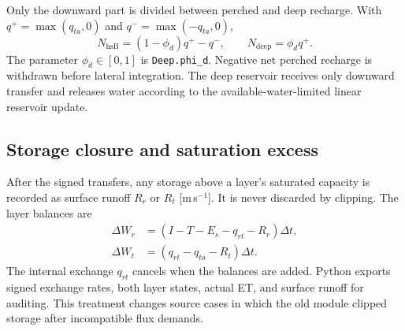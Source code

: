 Only the downward part is divided between perched and deep recharge. With $q^+=\max(q_{ta},0)$ and $q^-=\max(-q_{ta},0)$,
\begin{equation}
N_{\mathrm{hsB}}=(1-\phi_d)q^+-q^-,\qquad
N_{\mathrm{deep}}=\phi_d q^+.
\label{eq:split_recharge}
\end{equation}
The parameter $\phi_d\in[0,1]$ is \texttt{Deep.phi\_d}. Negative net perched recharge is withdrawn before lateral integration. The deep reservoir receives only downward transfer and releases water according to the available-water-limited linear reservoir update.

\subsection{Storage closure and saturation excess}

After the signed transfers, any storage above a layer's saturated capacity is recorded as surface runoff $R_r$ or $R_t$ [m\,s$^{-1}$]. It is never discarded by clipping. The layer balances are
\begin{align}
\Delta W_r&=(I-T-E_s-q_{rt}-R_r)\Delta t,\\
\Delta W_t&=(q_{rt}-q_{ta}-R_t)\Delta t.\label{eq:tz_balance}
\end{align}
The internal exchange $q_{rt}$ cancels when the balances are added. Python exports signed exchange rates, both layer states, actual ET, and surface runoff for auditing. This treatment changes source cases in which the old module clipped storage after incompatible flux demands.

\newpage
